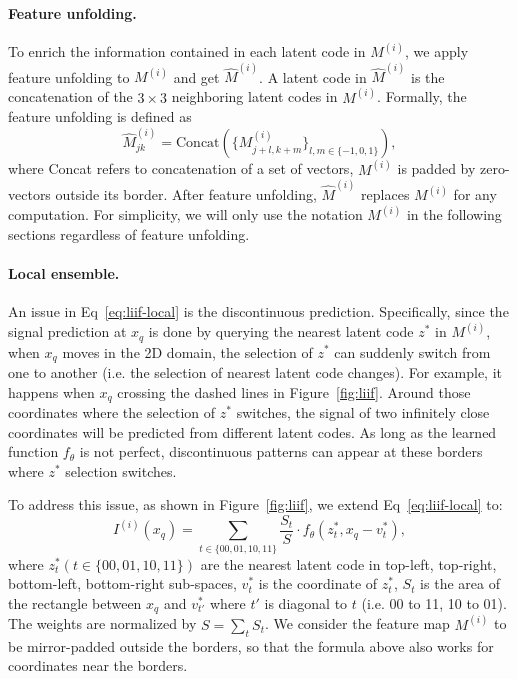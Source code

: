 \documentclass[final]{cvpr}
\begin{document}
\vspace{-1em}
\paragraph{Feature unfolding.} To enrich the information contained in each latent code in $M^{(i)}$, we apply feature unfolding to $M^{(i)}$ and get $\hat{M}^{(i)}$. A latent code in $\hat{M}^{(i)}$ is the concatenation of the $3\times 3$ neighboring latent codes in $M^{(i)}$. Formally, the feature unfolding is defined as
\begin{equation}
    \hat{M}^{(i)}_{jk} = \textrm{Concat}(\{M^{(i)}_{j+l,k+m}\}_{l,m\in\{-1,0,1\}}),
\end{equation}
where Concat refers to concatenation of a set of vectors, $M^{(i)}$ is padded by zero-vectors outside its border. After feature unfolding, $\hat{M}^{(i)}$ replaces $M^{(i)}$ for any computation. For simplicity, we will only use the notation $M^{(i)}$ in the following sections regardless of feature unfolding. 

\vspace{-1em}
\paragraph{Local ensemble.} An issue in Eq~\ref{eq:liif-local} is the discontinuous prediction. Specifically, since the signal prediction at $x_q$ is done by querying the nearest latent code $z^*$ in $M^{(i)}$, when $x_q$ moves in the 2D domain, the selection of $z^*$ can suddenly switch from one to another (i.e. the selection of nearest latent code changes). For example, it happens when $x_q$ crossing the dashed lines in Figure~\ref{fig:liif}. Around those coordinates where the selection of $z^*$ switches, the signal of two infinitely close coordinates will be predicted from different latent codes. As long as the learned function $f_\theta$ is not perfect, discontinuous patterns can appear at these borders where $z^*$ selection switches.

To address this issue, as shown in Figure~\ref{fig:liif}, we extend Eq~\ref{eq:liif-local} to:
\begin{equation}
    I^{(i)}({x_q}) = \sum_{t\in\{00,01,10,11\}} \frac{S_t}{S} \cdot f_\theta(z^*_t, x_q - v^*_t),
\end{equation}
where $z^*_t (t\in\{00,01,10,11\})$ are the nearest latent code in top-left, top-right, bottom-left, bottom-right sub-spaces, $v^*_t$ is the coordinate of $z^*_t$, $S_t$ is the area of the rectangle between $x_q$ and $v^*_{t'}$ where $t'$ is diagonal to $t$ (i.e. 00 to 11, 10 to 01). The weights are normalized by $S=\sum_t S_t$. We consider the feature map $M^{(i)}$ to be mirror-padded outside the borders, so that the formula above also works for coordinates near the borders.
\end{document}
